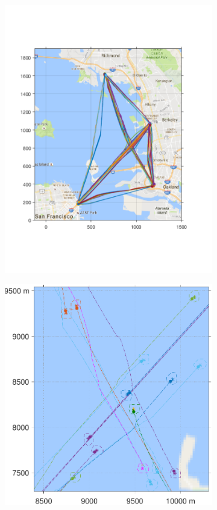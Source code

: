 \begin{figure}[!htb]
 \centering
\begin{subfigure}{0.5\textwidth}
  \includegraphics[width=\columnwidth]{figs/bayArea_d11sep5}
  \subcaption{}
  \label{fig:bayArea_d11sep5}
\end{subfigure}%
\begin{subfigure}{0.5\textwidth}
  \includegraphics[width=\columnwidth]{figs/bayArea_d11sep5_zoomed}

\end{subfigure}
\end{figure}

